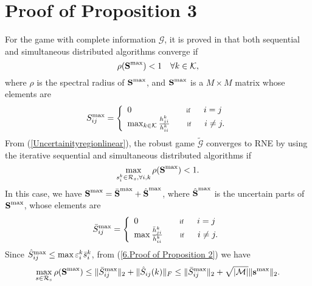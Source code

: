 \documentclass[peerreview,onecolumn,11pt,draftclsnofoot]{IEEEtran}\usepackage{amsmath}\usepackage{amsfonts}\usepackage{epsfig}\usepackage{amssymb}\usepackage{graphicx}\usepackage{amssymb,amsmath}\usepackage{cite}\usepackage{color,soul}\newcommand\T{\rule{0pt}{3.1ex}}
\begin{document}
\section{Proof of Proposition 3}
For the game with complete information $\mathcal{G}$, it is proved in \cite{Nash2} that both sequential and simultaneous distributed algorithms converge if
\begin{equation}\label{1. Proof of Proposition 3.}
\rho(\textbf{S}^{\scriptsize{\textnormal{max}}})<1 \quad \forall k \in \mathcal{K},
\end{equation}
where $\rho$ is the spectral radius of
$\textbf{S}^{\scriptsize{\textnormal{max}}}$, and $\textbf{S}^{\scriptsize{\textnormal{max}}}$ is a $M \times M$ matrix whose elements are
\begin{eqnarray}\label{2. Proof of Proposition 3.}
 S_{ij}^{\scriptsize{\textnormal{max}}}=  \left\{\begin{array}{l l}
0 \qquad\qquad \qquad\,\;\scriptsize{\textnormal{if}}\qquad i=j \\
\max_{k \in \mathcal{K}} \frac{h^{k}_{ji}}{h^{k}_{ii}} \qquad
\scriptsize{\textnormal{if}} \qquad i\neq j.
\end{array} \right.
 \end{eqnarray}
From (\ref{Uncertainityregionlinear}), the robust game
$\widetilde{\mathcal{G}}$ converges to RNE by using the iterative sequential and simultaneous distributed algorithms if
\begin{equation}\label{3. Proof of Proposition 3.}
    \max_{s_{i}^{k} \in \mathcal{R}_{s} , \forall i, k} \rho (\textbf{S}^{\scriptsize{\textnormal{max}}})<1.
\end{equation}
In this case, we have $\textbf{S}^{\scriptsize{\textnormal{max}}}= \bar{\textbf{S}}^{\scriptsize{\textnormal{max}}}+
   \hat{\textbf{S}}^{\scriptsize{\textnormal{max}}}$, where $\hat{\textbf{S}}^{\scriptsize{\textnormal{max}}}$ is the uncertain parts of $\textbf{S}^{\scriptsize{\textnormal{max}}}$, whose elements are
\begin{eqnarray}\label{5. Proof of Proposition 3.}
 \bar{S}_{ij}^{\scriptsize{\textnormal{max}}}=  \left\{\begin{array}{l l}
0 \qquad\qquad \;\;\;\scriptsize{\textnormal{if}}\qquad i=j \\
\max \frac{\bar{h}^{k}_{ji}}{\bar{h}^{k}_{ii}} \qquad
\scriptsize{\textnormal{if}} \qquad i\neq j. \end{array} \right.
 \end{eqnarray}
Since $\hat{S}_{ij}^{\scriptsize{\textnormal{max}}}\leq \max
\varepsilon_{i}^{k} \bar{s}_{i}^{k}$, from (\ref{6.Proof of Proposition 2}) we have
\begin{eqnarray}\label{6.Proof of Proposition 3}
      \max_{s\in \mathcal{R}_{s}} \rho (\textbf{S}^{\scriptsize{\textnormal{max}}})\leq  \|\bar{S}_{ij}^{\scriptsize{\textnormal{max}}} \|_{2}+ \|\hat{S}_{ij}(k)\|_{F}\leq  \|\bar{S}_{ij}^{\scriptsize{\textnormal{max}}}\|_{2}+ \sqrt{|\mathcal{M}|}\|\mathbf{s}^{\scriptsize{\textnormal{max}}}\|_{2}.
\end{eqnarray}



\end{document}

